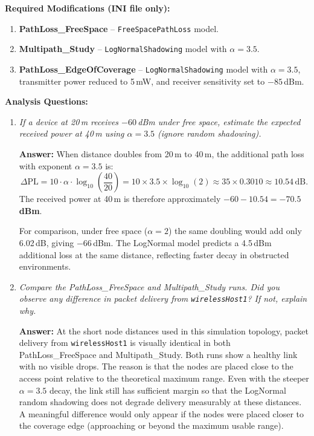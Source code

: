 \documentclass[12pt]{article}
\begin{document}
\textbf{Required Modifications (INI file only):}
\begin{enumerate}
    \item \textbf{PathLoss\_FreeSpace} -- \texttt{FreeSpacePathLoss} model.
    \item \textbf{Multipath\_Study} -- \texttt{LogNormalShadowing} model with
          $\alpha = 3.5$.
    \item \textbf{PathLoss\_EdgeOfCoverage} -- \texttt{LogNormalShadowing} model
          with $\alpha = 3.5$, transmitter power reduced to 5\,mW, and receiver
          sensitivity set to $-85$\,dBm.
\end{enumerate}

\textbf{Analysis Questions:}
\begin{enumerate}

    \item \textit{If a device at 20\,m receives $-60$\,dBm under free space,
          estimate the expected received power at 40\,m using $\alpha = 3.5$
          (ignore random shadowing).}

    \textbf{Answer:}
    When distance doubles from 20\,m to 40\,m, the additional path loss with
    exponent $\alpha = 3.5$ is:
    \[
      \Delta\mathrm{PL}
        = 10\cdot\alpha\cdot\log_{10}\!\left(\frac{40}{20}\right)
        = 10 \times 3.5 \times \log_{10}(2)
        \approx 35 \times 0.3010
        \approx 10.54\,\text{dB}.
    \]
    The received power at 40\,m is therefore approximately
    $-60 - 10.54 = \mathbf{-70.5}$\,\textbf{dBm}.

    For comparison, under free space ($\alpha = 2$) the same doubling would
    add only 6.02\,dB, giving $-66$\,dBm. The LogNormal model predicts a
    4.5\,dBm additional loss at the same distance, reflecting faster decay in
    obstructed environments.

    \item \textit{Compare the PathLoss\_FreeSpace and Multipath\_Study runs. Did
          you observe any difference in packet delivery from \texttt{wirelessHost1}?
          If not, explain why.}

    \textbf{Answer:}
    At the short node distances used in this simulation topology, packet delivery
    from \texttt{wirelessHost1} is visually identical in both
    PathLoss\_FreeSpace and Multipath\_Study. Both runs show a healthy link with
    no visible drops. The reason is that the nodes are placed close to the access
    point relative to the theoretical maximum range. Even with the steeper
    $\alpha = 3.5$ decay, the link still has sufficient margin so that the
    LogNormal random shadowing does not degrade delivery measurably at these
    distances. A meaningful difference would only appear if the nodes were placed
    closer to the coverage edge (approaching or beyond the maximum usable range).


\end{enumerate}
\end{document}
